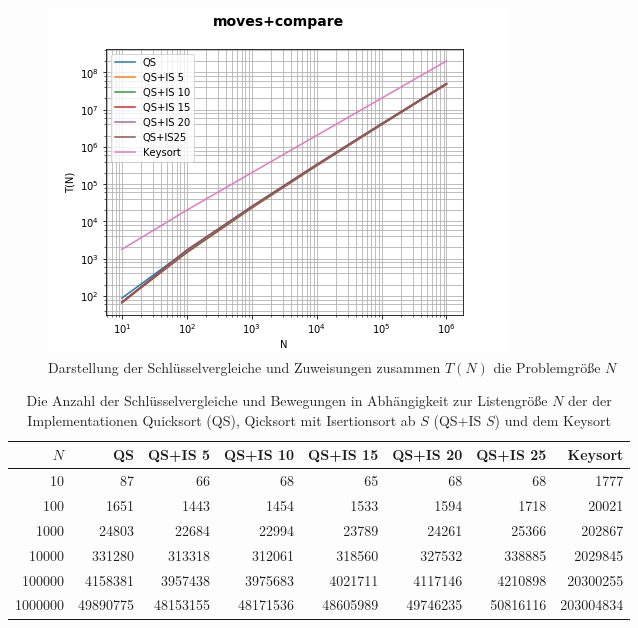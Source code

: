\documentclass[
   draft=false
  ,paper=a4
  ,twoside=false
  ,fontsize=11pt
  ,headsepline
  ,DIV=11
  ,parskip=full+
  ,titlepage
]{scrartcl} %
\begin{document}
\begin{figure}[htp]
  \centering
  \includegraphics[width=\textwidth]{../moves+compare.png}
  \caption[Bewegungen und Vergleiche]{Darstellung der Schlüsselvergleiche und Zuweisungen zusammen $T(N)$ die Problemgröße $N$ }
  \label{fig:total}
\end{figure}


\begin{table}[htp]
  \centering
  \caption[Bewegungen und Vergleiche]{Die Anzahl der Schlüsselvergleiche und Bewegungen in Abhängigkeit 
  zur Listengröße $N$ der  der Implementationen Quicksort (QS),
  Qicksort mit Isertionsort ab $S$ (QS+IS $S$) und dem Keysort}
  \label{tab:total}
  \begin{tabular}{|r|r|r|r|r|r|r|r|}
  \hline
  $N$ & QS & QS+IS 5 & QS+IS 10 & QS+IS 15 & QS+IS 20 & QS+IS 25 & Keysort \\
  \hline
  10 & 87 & 66 & 68 & 65 & 68 & 68 & 1777 \\
100 & 1651 & 1443 & 1454 & 1533 & 1594 & 1718 & 20021 \\
1000 & 24803 & 22684 & 22994 & 23789 & 24261 & 25366 & 202867 \\
10000 & 331280 & 313318 & 312061 & 318560 & 327532 & 338885 & 2029845 \\
100000 & 4158381 & 3957438 & 3975683 & 4021711 & 4117146 & 4210898 & 20300255 \\
1000000 & 49890775 & 48153155 & 48171536 & 48605989 & 49746235 & 50816116 & 203004834 \\
\hline
  \end{tabular}
\end{table}
\end{document}
